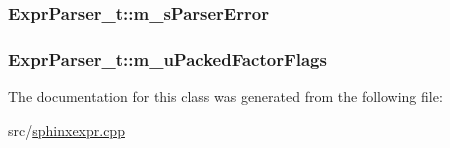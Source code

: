 \hypertarget{classExprParser__t_ac5b3f0ac3ff816672f3a53910fe1cab9}{
\subsubsection[{m\-\_\-s\-Parser\-Error}]{ Expr\-Parser\-\_\-t\-::m\-\_\-s\-Parser\-Error\hspace{0.3cm}{\ttfamily [protected]}}}\label{classExprParser__t_ac5b3f0ac3ff816672f3a53910fe1cab9}
\hypertarget{classExprParser__t_a98dfb1fb9e4498b7289cb9591e6766a0}{
\subsubsection[{m\-\_\-u\-Packed\-Factor\-Flags}]{ Expr\-Parser\-\_\-t\-::m\-\_\-u\-Packed\-Factor\-Flags}}\label{classExprParser__t_a98dfb1fb9e4498b7289cb9591e6766a0}


The documentation for this class was generated from the following file\-:\begin{DoxyCompactItemize}
\item 
src/\hyperlink{sphinxexpr_8cpp}{sphinxexpr.\-cpp}\end{DoxyCompactItemize}
